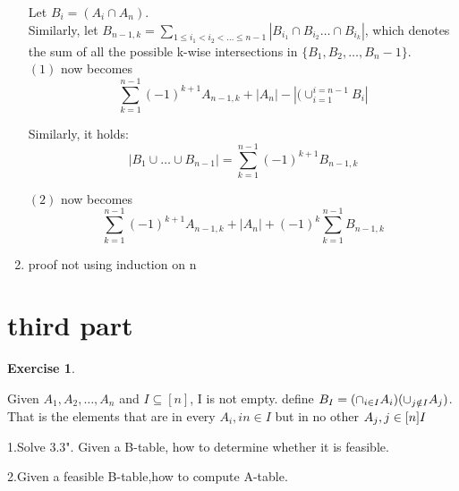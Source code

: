 \documentclass[12pt,a4]{article}
\newtheorem{exercise}[theorem]{Exercise}
\begin{document}
\begin{enumerate}
		 Let $B_i = (A_i\cap A_n)$.\\

		 Similarly, let $B_{n-1,k} = \sum\limits_{1\le i_1<i_2<\ldots\le n-1}\left\vert{B_{i_1}\cap B_{i_2}\ldots\cap B_{i_k}}\right\vert$, which denotes the sum of all the possible k-wise intersections in $\{B_1,B_2,\ldots,B_n-1\}$.\\

		 $(1)$ now becomes\\

		 \begin{equation}
		  \sum\limits_{k=1}^{n-1}(-1)^{k+1}A_{n-1,k} + \left\vert{A_n}\right\vert - \left\vert{(\cup_{i=1}^{i=n-1}B_i }\right\vert 
		 \end{equation}

		 Similarly, it holds:\\
		 \begin{equation}
		 \left\vert{B_1\cup\ldots\cup B_{n-1}}\right\vert = \sum\limits_{k=1}^{n-1}(-1)^{k+1}B_{n-1,k}
		 \end{equation}

		 $(2)$ now becomes\\
		 \begin{equation}
		  \sum\limits_{k=1}^{n-1}(-1)^{k+1}A_{n-1,k} + \left\vert{A_n}\right\vert + (-1)^k \sum\limits_{k=1}^{n-1}B_{n-1,k}
		 \end{equation}	

		 	 




		\item proof not using induction on n
\end{enumerate}

	


\section{third part}
\begin{exercise}
\end{exercise}
Given $A_1,A_2,\ldots,A_n$ and $I\subseteq[n]$, I is not empty.
define $B_I = (\cap_
{i\in I}A_i)\\(\cup_{j\notin I}A_j)$. That is the elements that are in every $A_i,in\in I$
but in no{} other $A_j,j\in [n]\\I$

1.Solve 3.3". Given a B-table, how to determine whether it is feasible.

2.Given a feasible B-table,how to compute A-table.
\end{document}
